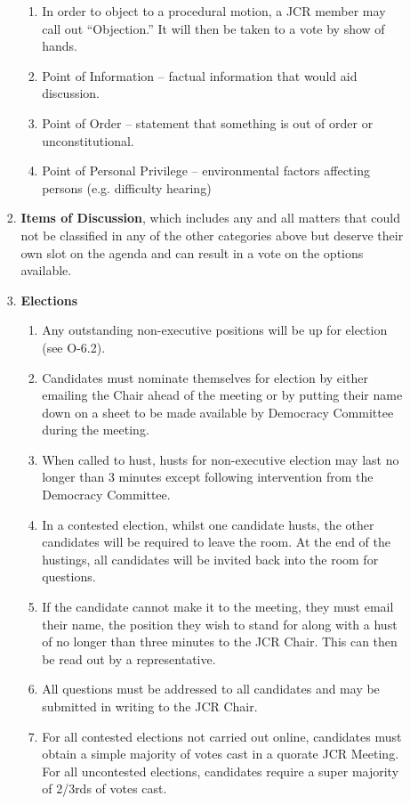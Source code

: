 \begin{enumerate}
\begin{enumerate}
\begin{enumerate}
\begin{enumerate}
                \item In order to object to a procedural motion, a JCR member may call out “Objection.” It will then be taken to a vote by show of hands.
                \item Point of Information – factual information that would aid discussion.
                \item Point of Order – statement that something is out of order or unconstitutional.
                \item Point of Personal Privilege – environmental factors affecting persons (e.g. difficulty hearing)
            \end{enumerate}
            \item \textbf{Items of Discussion}, which includes any and all matters that could not be classified in any of the other categories above but deserve their own slot on the agenda and can result in a vote on the options available.
            \item \textbf{Elections}
            \begin{enumerate}
                \item Any outstanding non-executive positions will be up for election (see O-6.2).
                \item Candidates must nominate themselves for election by either emailing the Chair ahead of the meeting or by putting their name down on a sheet to be made available by Democracy Committee during the meeting.
                \item When called to hust, husts for non-executive election may last no longer than 3 minutes except following intervention from the Democracy Committee.
                \item In a contested election, whilst one candidate husts, the other candidates will be required to leave the room. At the end of the hustings, all candidates will be invited back into the room for questions.
                \item If the candidate cannot make it to the meeting, they must email their name, the position they wish to stand for along with a hust of no longer than three minutes to the JCR Chair. This can then be read out by a representative.
                \item All questions must be addressed to all candidates and may be submitted in writing to the JCR Chair.
                \item For all contested elections not carried out online, candidates must obtain a simple majority of votes cast in a quorate JCR Meeting. For all uncontested elections, candidates require a super majority of 2/3rds of votes cast.

\end{enumerate}
\end{enumerate}
\end{enumerate}
\end{enumerate}
